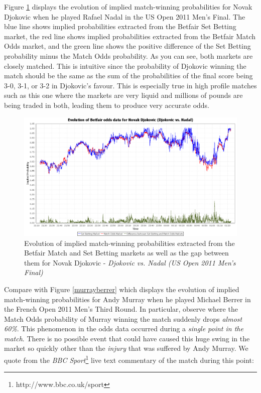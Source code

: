 \documentclass[letterpaper,12pt]{article}
\begin{document}
Figure \ref{djokovicnadal} displays the evolution of implied match-winning probabilities for Novak Djokovic when he played Rafael Nadal in the US Open 2011 Men's Final.  The blue line shows implied probabilities extracted from the Betfair Set Betting market, the red line shows implied probabilities extracted from the Betfair Match Odds market, and the green line shows the positive difference of the Set Betting probability minus the Match Odds probability.  As you can see, both markets are closely matched.  This is intuitive since the probability of Djokovic winning the match should be the same as the sum of the probabilities of the final score being 3-0, 3-1, or 3-2 in Djokovic's favour.  This is especially true in high profile matches such as this one where the markets are very liquid and millions of pounds are being traded in both, leading them to produce very accurate odds.

\begin{figure}[H]
\includegraphics[width=12.5cm]{matches/djokovicnadal}
\centering
\caption{Evolution of implied match-winning probabilities extracted from the Betfair Match and Set Betting markets as well as the gap between them for Novak Djokovic - \textit{Djokovic vs. Nadal (US Open 2011 Men's Final)}}
\label{djokovicnadal}
\end{figure}

Compare with Figure \ref{murrayberrer} which displays the evolution of implied match-winning probabilities for Andy Murray when he played Michael Berrer in the French Open 2011 Men's Third Round.  In particular, observe where the Match Odds probability of Murray winning the match suddenly drops \textit{almost 60\%}.  This phenomenon in the odds data occurred during a \textit{single point in the match}.  There is no possible event that could have caused this huge swing in the market so quickly other than the \textit{injury} that was suffered by Andy Murray.  We quote from the \textit{BBC Sport}\footnote{http://www.bbc.co.uk/sport} live text commentary of the match during this point:
\end{document}
